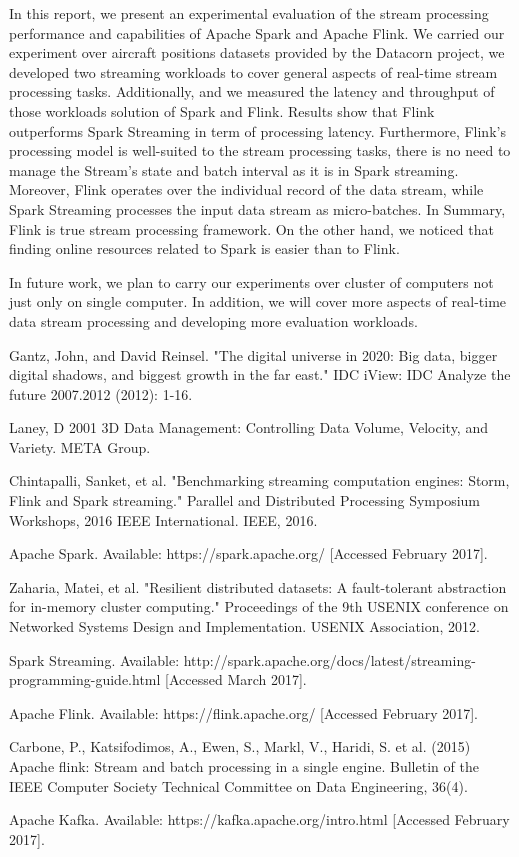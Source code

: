 \documentclass[]{article}
\begin{document}
In this report, we present an experimental evaluation of the stream processing performance and capabilities of Apache Spark and Apache Flink. We carried our experiment over aircraft positions datasets provided by the Datacorn project, we developed two streaming workloads to cover general aspects of real-time stream processing tasks. Additionally, and we measured the latency and throughput of those workloads solution of Spark and Flink. Results show that Flink outperforms Spark Streaming in term of processing latency. Furthermore, Flink's processing model is well-suited to the stream processing tasks, there is no need to manage the Stream's state and batch interval as it is in Spark streaming. Moreover, Flink operates over the individual record of the data stream, while Spark Streaming  processes the input data stream as micro-batches. In Summary, Flink is true stream processing framework. On the other hand, we noticed that finding online resources related to Spark is easier than to Flink.

In future work, we plan to carry our experiments over cluster of computers not just only on single computer. In addition, we will cover more aspects of real-time data stream processing and developing more evaluation workloads. 




\begin{thebibliography}{[MT1]}
%
Gantz, John, and David Reinsel. "The digital universe in 2020: Big data, bigger digital shadows, and biggest growth in the far east." IDC iView: IDC Analyze the future 2007.2012 (2012): 1-16.

Laney, D 2001 3D Data Management: Controlling Data Volume, Velocity, and Variety. META Group.

Chintapalli, Sanket, et al. "Benchmarking streaming computation engines: Storm, Flink and Spark streaming." Parallel and Distributed Processing Symposium Workshops, 2016 IEEE International. IEEE, 2016.

Apache Spark. Available: https://spark.apache.org/ [Accessed February 2017].

Zaharia, Matei, et al. "Resilient distributed datasets: A fault-tolerant abstraction for in-memory cluster computing." Proceedings of the 9th USENIX conference on Networked Systems Design and Implementation. USENIX Association, 2012.

Spark Streaming. Available: http://spark.apache.org/docs/latest/streaming-programming-guide.html [Accessed March 2017].

Apache Flink. Available: https://flink.apache.org/ [Accessed February 2017].

Carbone, P., Katsifodimos, A., Ewen, S., Markl, V., Haridi, S. et al. (2015)
Apache flink: Stream and batch processing in a single engine.
Bulletin of the IEEE Computer Society Technical Committee on Data Engineering, 36(4).

Apache Kafka. Available: https://kafka.apache.org/intro.html [Accessed February 2017].

%
\end{thebibliography}
\end{document}
